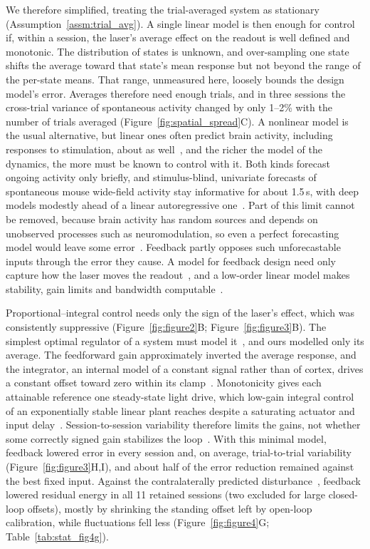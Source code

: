 We therefore simplified, treating the trial-averaged system as stationary (Assumption~\ref{assm:trial_avg}).
A single linear model is then enough for control if, within a session, the laser's average effect on the readout is well defined and monotonic.
The distribution of states is unknown, and over-sampling one state shifts the average toward that state's mean response but not beyond the range of the per-state means.
That range, unmeasured here, loosely bounds the design model's error.
Averages therefore need enough trials, and in three sessions the cross-trial variance of spontaneous activity changed by only 1--2\% with the number of trials averaged (Figure~\ref{fig:spatial_spread}C).
A nonlinear model is the usual alternative, but linear ones often predict brain activity, including responses to stimulation, about as well~\citep{Nozari2024,sani2024dissociative,Yang2021}, and the richer the model of the dynamics, the more must be known to control with it.
Both kinds forecast ongoing activity only briefly, and stimulus-blind, univariate forecasts of spontaneous mouse wide-field activity stay informative for about 1.5\,s, with deep models modestly ahead of a linear autoregressive one~\citep{lu2025benchmarking}.
Part of this limit cannot be removed, because brain activity has random sources and depends on unobserved processes such as neuromodulation, so even a perfect forecasting model would leave some error~\citep{lueckmann2025zapbench}.
Feedback partly opposes such unforecastable inputs through the error they cause.
A model for feedback design need only capture how the laser moves the readout~\citep{gevers2005identification}, and a low-order linear model makes stability, gain limits and bandwidth computable~\citep{astrom2008feedback}.

Proportional--integral control needs only the sign of the laser's effect, which was consistently suppressive (Figure~\ref{fig:figure2}B; Figure~\ref{fig:figure3}B).
The simplest optimal regulator of a system must model it~\citep{conant1970every}, and ours modelled only its average.
The feedforward gain approximately inverted the average response, and the integrator, an internal model of a constant signal rather than of cortex, drives a constant offset toward zero within its clamp~\citep{francis1976internal}.
Monotonicity gives each attainable reference one steady-state light drive, which low-gain integral control of an exponentially stable linear plant reaches despite a saturating actuator and input delay~\citep{logemann2000absolute}.
Session-to-session variability therefore limits the gains, not whether some correctly signed gain stabilizes the loop~\citep{morari1985robust}.
With this minimal model, feedback lowered error in every session and, on average, trial-to-trial variability (Figure~\ref{fig:figure3}H,I), and about half of the error reduction remained against the best fixed input.
Against the contralaterally predicted disturbance~\citep{Shimaoka2019,Ye2026}, feedback lowered residual energy in all 11 retained sessions (two excluded for large closed-loop offsets), mostly by shrinking the standing offset left by open-loop calibration, while fluctuations fell less (Figure~\ref{fig:figure4}G; Table~\ref{tab:stat_fig4g}).

